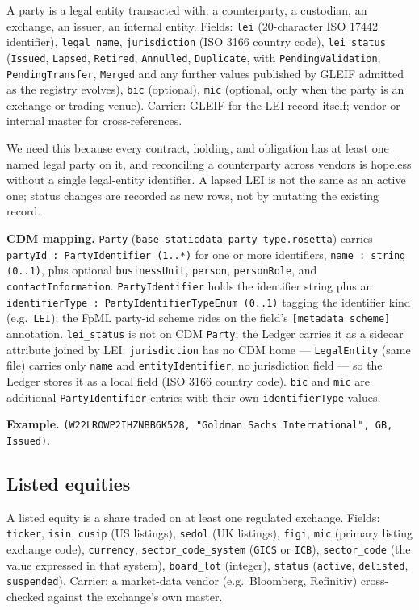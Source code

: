 \documentclass[11pt,a4paper]{article}
\begin{document}
A party is a legal entity transacted with: a counterparty, a custodian, an exchange, an issuer, an internal entity. Fields: \texttt{lei} (20-character ISO 17442 identifier), \texttt{legal\_name}, \texttt{jurisdiction} (ISO 3166 country code), \texttt{lei\_status} (\texttt{Issued}, \texttt{Lapsed}, \texttt{Retired}, \texttt{Annulled}, \texttt{Duplicate}, with \texttt{PendingValidation}, \texttt{PendingTransfer}, \texttt{Merged} and any further values published by GLEIF admitted as the registry evolves), \texttt{bic} (optional), \texttt{mic} (optional, only when the party is an exchange or trading venue). Carrier: GLEIF for the LEI record itself; vendor or internal master for cross-references.

We need this because every contract, holding, and obligation has at least one named legal party on it, and reconciling a counterparty across vendors is hopeless without a single legal-entity identifier. A lapsed LEI is not the same as an active one; status changes are recorded as new rows, not by mutating the existing record.

\textbf{CDM mapping.} \texttt{Party} (\texttt{base-staticdata-party-type.rosetta}) carries \texttt{partyId : PartyIdentifier (1..*)} for one or more identifiers, \texttt{name : string (0..1)}, plus optional \texttt{businessUnit}, \texttt{person}, \texttt{personRole}, and \texttt{contactInformation}. \texttt{PartyIdentifier} holds the identifier string plus an \texttt{identifierType : PartyIdentifierTypeEnum (0..1)} tagging the identifier kind (e.g.\ \texttt{LEI}); the FpML party-id scheme rides on the field's \texttt{[metadata scheme]} annotation. \texttt{lei\_status} is not on CDM \texttt{Party}; the Ledger carries it as a sidecar attribute joined by LEI. \texttt{jurisdiction} has no CDM home --- \texttt{LegalEntity} (same file) carries only \texttt{name} and \texttt{entityIdentifier}, no jurisdiction field --- so the Ledger stores it as a local field (ISO 3166 country code). \texttt{bic} and \texttt{mic} are additional \texttt{PartyIdentifier} entries with their own \texttt{identifierType} values.

\textbf{Example.} \texttt{(W22LROWP2IHZNBB6K528, "Goldman Sachs International", GB, Issued)}.

\subsection{Listed equities}

A listed equity is a share traded on at least one regulated exchange. Fields: \texttt{ticker}, \texttt{isin}, \texttt{cusip} (US listings), \texttt{sedol} (UK listings), \texttt{figi}, \texttt{mic} (primary listing exchange code), \texttt{currency}, \texttt{sector\_code\_system} (\texttt{GICS} or \texttt{ICB}), \texttt{sector\_code} (the value expressed in that system), \texttt{board\_lot} (integer), \texttt{status} (\texttt{active}, \texttt{delisted}, \texttt{suspended}). Carrier: a market-data vendor (e.g.\ Bloomberg, Refinitiv) cross-checked against the exchange's own master.
\end{document}
